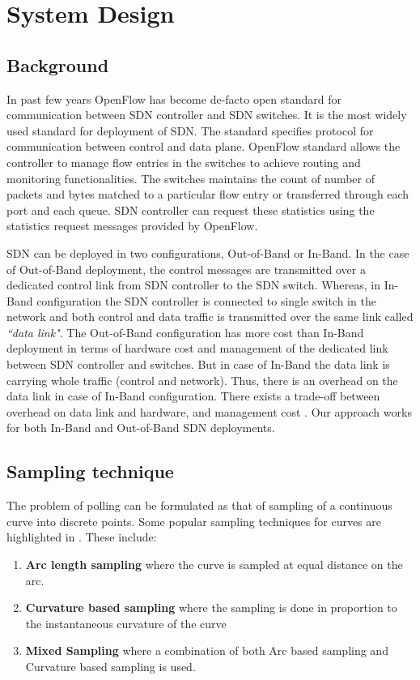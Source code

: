 \section{System Design}
\label{system_design}
\subsection{Background}
\label{background}
In past few years OpenFlow \cite{openflow} has become de-facto open standard for communication between SDN controller and SDN switches. 
It is the most widely used standard for deployment of SDN.
The standard specifies protocol for communication between control and data plane.
OpenFlow standard allows the controller to manage flow entries in the switches to achieve routing and monitoring functionalities.
The switches maintains the count of number of packets and bytes matched to a particular flow entry or transferred through each port and each queue.
SDN controller can request these statistics using the statistics request messages provided by OpenFlow. 

SDN can be deployed in two configurations, Out-of-Band or In-Band.
In the case of Out-of-Band deployment, the control messages are transmitted over a dedicated control link from SDN controller to the SDN switch.
Whereas, in In-Band configuration the SDN controller is connected to single switch in the network and both control and data traffic is transmitted over the same link called \textit{``data link"}. 
The Out-of-Band configuration has more cost than In-Band deployment in terms of hardware cost and management of the dedicated link between SDN controller and switches.
But in case of In-Band the data link is carrying whole traffic (control and network). Thus, there is an overhead on the data link in case of In-Band configuration.
There exists a trade-off between overhead on data link and hardware, and management cost \cite{in-band_and_out-band}.
Our approach works for both In-Band and Out-of-Band SDN deployments.


\subsection{Sampling technique}
The problem of polling can be formulated as that of sampling of a continuous curve into discrete points.
Some popular sampling techniques for curves are highlighted in \cite{curvature}. These include:
\begin{enumerate}
\item
    \textbf{Arc length sampling} where the curve is sampled at equal distance on the arc.
\item
    \textbf{Curvature based sampling} where the sampling is done in proportion to the instantaneous curvature of the curve
\item
    \textbf{Mixed Sampling} where a combination of both Arc based sampling and Curvature based sampling is used.
\end{enumerate}

